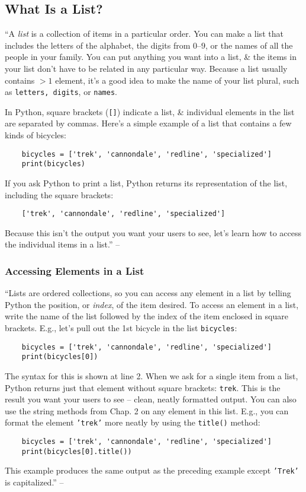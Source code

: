 \documentclass[oneside]{book}
\numberwithin{equation}{section}
\begin{document}
\subsection{What Is a List?}
``A \textit{list} is a collection of items in a particular order. You can make a list that includes the letters of the alphabet, the digits from $0$--$9$, or the names of all the people in your family. You can put anything you want into a list, \& the items in your list don't have to be related in any particular way. Because a list usually contains $> 1$ element, it's a good idea to make the name of your list plural, such as \texttt{letters, digits}, or \texttt{names}.

In Python, square brackets (\texttt{[]}) indicate a list, \& individual elements in the list are separated by commas. Here's a simple example of a list that contains a few kinds of bicycles:
\begin{verbatim}
	bicycles = ['trek', 'cannondale', 'redline', 'specialized']
	print(bicycles)
\end{verbatim}
If you ask Python to print a list, Python returns its representation of the list, including the square brackets:
\begin{verbatim}
	['trek', 'cannondale', 'redline', 'specialized']
\end{verbatim}
Because this isn't the output you want your users to see, let's learn how to access the individual items in a list.'' -- \cite[pp. 33--34]{Matthes2019}

\subsubsection{Accessing Elements in a List}
``Lists are ordered collections, so you can access any element in a list by telling Python the position, or \textit{index}, of the item desired. To access an element in a list, write the name of the list followed by the index of the item enclosed in square brackets. E.g., let's pull out the 1st bicycle in the list \texttt{bicycles}:
\begin{verbatim}
	bicycles = ['trek', 'cannondale', 'redline', 'specialized']
	print(bicycles[0])
\end{verbatim}
The syntax for this is shown at line 2. When we ask for a single item from a list, Python returns just that element without square brackets: \texttt{trek}. This is the result you want your users to see -- clean, neatly formatted output. You can also use the string methods from Chap. 2 on any element in this list. E.g., you can format the element \texttt{'trek'} more neatly by using the \texttt{title()} method:
\begin{verbatim}
	bicycles = ['trek', 'cannondale', 'redline', 'specialized']
	print(bicycles[0].title())
\end{verbatim}
This example produces the same output as the preceding example except \texttt{'Trek'} is capitalized.'' -- \cite[p. 34]{Matthes2019}
\end{document}

